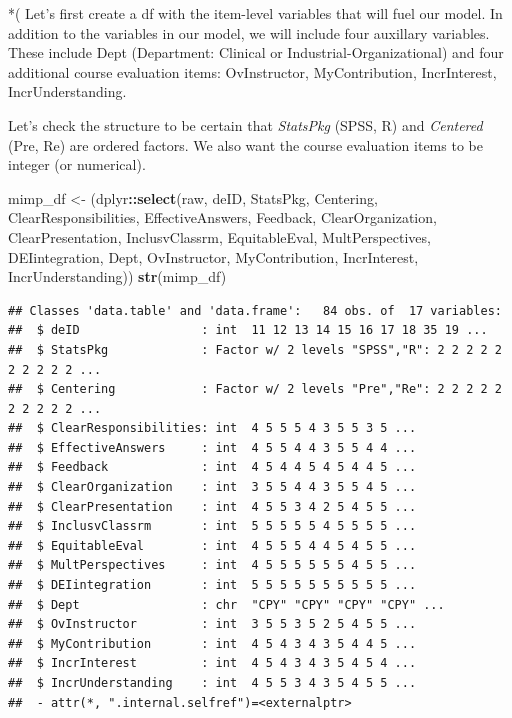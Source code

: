\documentclass[
  11pt,
]{book}
\newenvironment{Shaded}{\begin{snugshade}}{\end{snugshade}}
\newcommand{\FunctionTok}[1]{\textcolor[rgb]{0.27,0.27,0.27}{\textbf{#1}}}
\newcommand{\NormalTok}[1]{#1}
\newcommand{\OtherTok}[1]{\textcolor[rgb]{0.37,0.37,0.37}{#1}}
\newcommand{\SpecialCharTok}[1]{\textcolor[rgb]{0.43,0.43,0.43}{\textbf{#1}}}
\begin{document}
*( Let's first create a df with the item-level variables that will fuel our model. In addition to the variables in our model, we will include four auxillary variables. These include Dept (Department: Clinical or Industrial-Organizational) and four additional course evaluation items: OvInstructor, MyContribution, IncrInterest, IncrUnderstanding.

Let's check the structure to be certain that \emph{StatsPkg} (SPSS, R) and \emph{Centered} (Pre, Re) are ordered factors. We also want the course evaluation items to be integer (or numerical).

\begin{Shaded}
\begin{Highlighting}[]
\NormalTok{mimp\_df }\OtherTok{\textless{}{-}}\NormalTok{ (dplyr}\SpecialCharTok{::}\FunctionTok{select}\NormalTok{(raw, deID, StatsPkg, Centering, ClearResponsibilities,}
\NormalTok{    EffectiveAnswers, Feedback, ClearOrganization, ClearPresentation, InclusvClassrm,}
\NormalTok{    EquitableEval, MultPerspectives, DEIintegration, Dept, OvInstructor,}
\NormalTok{    MyContribution, IncrInterest, IncrUnderstanding))}
\FunctionTok{str}\NormalTok{(mimp\_df)}
\end{Highlighting}
\end{Shaded}

\begin{verbatim}
## Classes 'data.table' and 'data.frame':   84 obs. of  17 variables:
##  $ deID                 : int  11 12 13 14 15 16 17 18 35 19 ...
##  $ StatsPkg             : Factor w/ 2 levels "SPSS","R": 2 2 2 2 2 2 2 2 2 2 ...
##  $ Centering            : Factor w/ 2 levels "Pre","Re": 2 2 2 2 2 2 2 2 2 2 ...
##  $ ClearResponsibilities: int  4 5 5 5 4 3 5 5 3 5 ...
##  $ EffectiveAnswers     : int  4 5 5 4 4 3 5 5 4 4 ...
##  $ Feedback             : int  4 5 4 4 5 4 5 4 4 5 ...
##  $ ClearOrganization    : int  3 5 5 4 4 3 5 5 4 5 ...
##  $ ClearPresentation    : int  4 5 5 3 4 2 5 4 5 5 ...
##  $ InclusvClassrm       : int  5 5 5 5 5 4 5 5 5 5 ...
##  $ EquitableEval        : int  4 5 5 5 4 4 5 4 5 5 ...
##  $ MultPerspectives     : int  4 5 5 5 5 5 5 4 5 5 ...
##  $ DEIintegration       : int  5 5 5 5 5 5 5 5 5 5 ...
##  $ Dept                 : chr  "CPY" "CPY" "CPY" "CPY" ...
##  $ OvInstructor         : int  3 5 5 3 5 2 5 4 5 5 ...
##  $ MyContribution       : int  4 5 4 3 4 3 5 4 4 5 ...
##  $ IncrInterest         : int  4 5 4 3 4 3 5 4 5 4 ...
##  $ IncrUnderstanding    : int  4 5 5 3 4 3 5 4 5 5 ...
##  - attr(*, ".internal.selfref")=<externalptr>
\end{verbatim}
\end{document}
